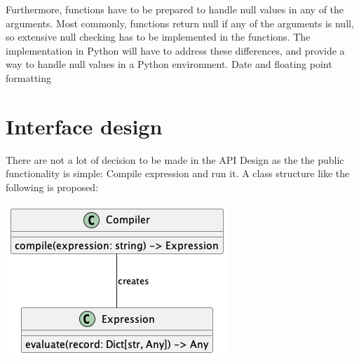 Furthermore, functions have to be prepared to handle null values in any of the
arguments. Most commonly, functions return null if any of the arguments is null,
so extensive null checking has to be implemented in the functions.
The implementation in Python will have to address these differences, and
provide a way to handle null values in a Python environment.
Date and floating point formatting

\section{Interface design}

There are not a lot of decision to be made in the API Design as the the public
functionality is simple: Compile expression and run it. A class structure like the following is proposed:

\includegraphics[scale=0.7]{diagrams/api_design-class.png}





